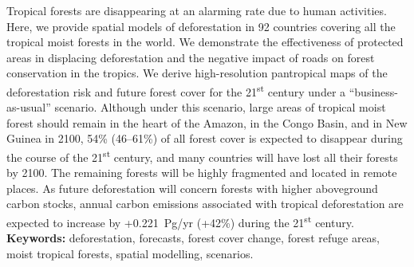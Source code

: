 \documentclass[
  12pt,
]{article}
\begin{document}
Tropical forests are disappearing at an alarming rate due to human activities. Here, we provide spatial models of deforestation in 92 countries covering all the tropical moist forests in the world. We demonstrate the effectiveness of protected areas in displacing deforestation and the negative impact of roads on forest conservation in the tropics. We derive high-resolution pantropical maps of the deforestation risk and future forest cover for the 21\textsuperscript{st} century under a ``business-as-usual'' scenario. Although under this scenario, large areas of tropical moist forest should remain in the heart of the Amazon, in the Congo Basin, and in New Guinea in 2100, 54\% (46--61\%) of all forest cover is expected to disappear during the course of the 21\textsuperscript{st} century, and many countries will have lost all their forests by 2100. The remaining forests will be highly fragmented and located in remote places. As future deforestation will concern forests with higher aboveground carbon stocks, annual carbon emissions associated with tropical deforestation are expected to increase by +0.221~Pg/yr (+42\%) during the 21\textsuperscript{st} century.\\

\noindent\textbf{Keywords:} deforestation, forecasts, forest cover change, forest refuge areas, moist tropical forests, spatial modelling, scenarios.


\newpage

\end{document}
